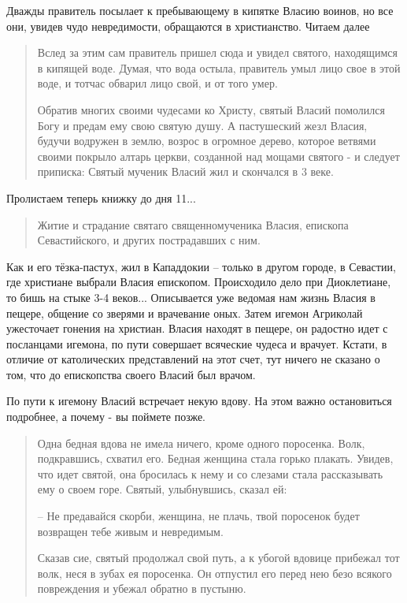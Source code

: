 \documentclass[a5paper,11pt,openany]{article}
\begin{document}
Дважды правитель посылает к пребывающему в кипятке Власию воинов, но все они, увидев чудо невредимости, обращаются в христианство. Читаем далее

\begin{quotation}
\noindent Вслед за этим сам правитель пришел сюда и увидел святого, находящимся в кипящей воде. Думая, что вода остыла, правитель умыл лицо свое в этой воде, и тотчас обварил лицо свой, и от того умер.

   Обратив многих своими чудесами ко Христу, святый Власий помолился Богу и предам ему свою святую душу. А пастушеский жезл Власия, будучи водружен в землю, возрос в огромное дерево, которое ветвями своими покрыло алтарь церкви, созданной над мощами святого - и следует приписка: Святый мученик Власий жил и скончался в 3 веке.
\end{quotation}

Пролистаем теперь книжку до дня 11...


\begin{quotation}
Житие и страдание святаго священномученика Власия, епископа Севастийского, и других пострадавших с ним.
\end{quotation}

 Как и его тёзка-пастух, жил в Кападдокии – только в другом городе, в Севастии, где христиане выбрали Власия епископом. Происходило дело при Диоклетиане, то бишь на стыке 3-4 веков... Описывается уже ведомая нам жизнь Власия в пещере, общение со зверями и врачевание оных. Затем игемон Агриколай ужесточает гонения на христиан. Власия находят в пещере, он радостно идет с посланцами игемона, по пути совершает всяческие чудеса и врачует. Кстати, в отличие от католических представлений на этот счет, тут ничего не сказано о том, что до епископства своего Власий был врачом. 

   По пути к игемону Власий встречает некую вдову. На этом важно остановиться подробнее, а почему - вы поймете позже.

\begin{quotation}
\noindent Одна бедная вдова не имела ничего, кроме одного поросенка. Волк, подкравшись, схватил его. Бедная женщина стала горько плакать. Увидев, что идет святой, она бросилась к нему и со слезами стала рассказывать ему о своем горе. Святый, улыбнувшись, сказал ей:

 – Не предавайся скорби, женщина, не плачь, твой поросенок будет возвращен тебе живым и невредимым.

   Сказав сие, святый продолжал свой путь, а к убогой вдовице прибежал тот волк, неся в зубах ея поросенка. Он отпустил его перед нею безо всякого повреждения и убежал обратно в пустыню.
\end{quotation}
\end{document}

